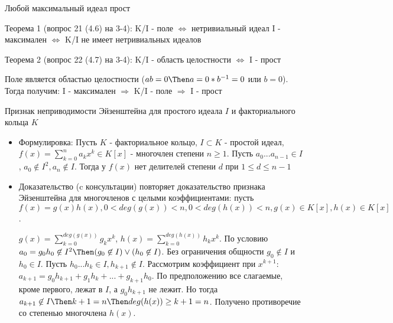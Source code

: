 \begin{problem} [27]
	Любой максимальный идеал прост
\end{problem}
\begin{solution}
	Теорема 1 (вопрос 21 (4.6) на 3-4): K/I - поле $\Leftrightarrow$ нетривиальный идеал I - максимален $\Leftrightarrow$ K/I не имеет нетривиальных идеалов
	
	Теорема 2 (вопрос 22 (4.7) на 3-4): K/I - область целостности $\Leftrightarrow$ I - прост
	
	Поле является областью целостности ($ab=0 \Then a = 0*b^{-1}= 0$ или $b = 0$). Тогда получим: I - максимален $\Rightarrow$ K/I - поле $\Rightarrow$ I - прост
\end{solution}

\begin{problem} [28]
	Признак неприводимости Эйзенштейна для простого идеала $I$ и факториального кольца $K$
\end{problem}
\begin{solution}
	\begin{itemize}
	\item Формулировка: Пусть $K$ - факториальное кольцо, $I \subset K$ - простой идеал, $f(x) = \sum\limits_{k=0}^{n} a_kx^k  \in K[x]$ - многочлен степени $n \geq 1$. Пусть $a_0...a_{n-1} \in I$, $a_0 \not\in I^2, a_n \not\in I$. Тогда у $f(x)$ нет делителей степени $d$ при $1 \leq d \leq n-1$
	
	\item Доказательство (c консультации) повторяет доказательство признака Эйзенштейна для многочленов с целыми коэффициентами: пусть $f(x) = g(x)h(x), 0 < deg(g(x)) < n, 0 < deg(h(x)) < n, g(x) \in K[x], h(x) \in K[x]$.
	
	$g(x) = \sum\limits_{k=0}^{deg(g(x))} g_kx^k$, $h(x) = \sum\limits_{k=0}^{deg(h(x))} h_kx^k$. По условию $a_0 = g_0h_0 \not\in I^2 \Then (g_0 \not\in I) \vee (h_0 \not\in I)$. Без ограничения общности $g_0 \not\in I$ и $h_0 \in I$. Пусть $h_0...h_k \in I, h_{k+1} \not\in I$. Рассмотрим коэффициент при $x^{k+1}$: $a_{k+1} = g_0h_{k+1} + g_1h_k + ... + g_{k+1}h_0$. По предположению все слагаемые, кроме первого, лежат в $I$, а $g_0h_{k+1}$ не лежит. Но тогда $a_{k+1} \not\in I \Then k+1 = n \Then deg(h(x)) \geq k + 1 = n$. Получено противоречие со степенью многочлена $h(x)$.
	\end{itemize}
\end{solution}

